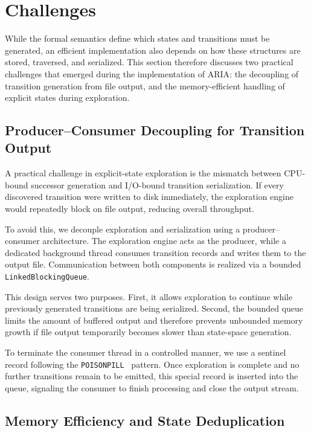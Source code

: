 \section{Challenges}
\label{sec:challenges}
While the formal semantics define which states and transitions must be generated, an efficient implementation also depends on how these structures are stored, traversed, and serialized. This section therefore discusses two practical challenges that emerged during the implementation of \textsc{ARIA}: the decoupling of transition generation from file output, and the memory-efficient handling of explicit states during exploration.
\subsection{Producer--Consumer Decoupling for Transition Output}

A practical challenge in explicit-state exploration is the mismatch between CPU-bound successor generation and I/O-bound transition serialization. If every discovered transition were written to disk immediately, the exploration engine would repeatedly block on file output, reducing overall throughput.

To avoid this, we decouple exploration and serialization using a producer--consumer architecture. The exploration engine acts as the producer, while a dedicated background thread consumes transition records and writes them to the output file. Communication between both components is realized via a bounded \texttt{LinkedBlockingQueue}.

This design serves two purposes. First, it allows exploration to continue while previously generated transitions are being serialized. Second, the bounded queue limits the amount of buffered output and therefore prevents unbounded memory growth if file output temporarily becomes slower than state-space generation.

To terminate the consumer thread in a controlled manner, we use a sentinel record following the \texttt{POISON\-PILL}~\cite{goetz2006java} pattern. Once exploration is complete and no further transitions remain to be emitted, this special record is inserted into the queue, signaling the consumer to finish processing and close the output stream.


\subsection{Memory Efficiency and State Deduplication}
\label{sec:efficiency}

